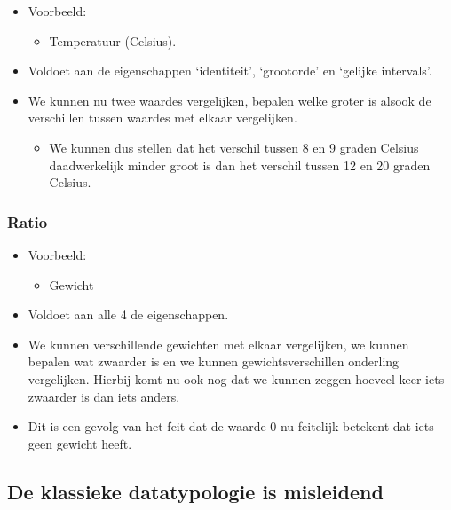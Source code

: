 \documentclass[]{tufte-book}
\providecommand{\tightlist}{%
  \setlength{\itemsep}{0pt}\setlength{\parskip}{0pt}}
\begin{document}
\begin{itemize}
\tightlist
\item
  Voorbeeld:

  \begin{itemize}
  \tightlist
  \item
    Temperatuur (Celsius).
  \end{itemize}
\item
  Voldoet aan de eigenschappen `identiteit', `grootorde' en `gelijke intervals'.
\item
  We kunnen nu twee waardes vergelijken, bepalen welke groter is alsook de verschillen tussen waardes met elkaar vergelijken.

  \begin{itemize}
  \tightlist
  \item
    We kunnen dus stellen dat het verschil tussen 8 en 9 graden Celsius daadwerkelijk minder groot is dan het verschil tussen 12 en 20 graden Celsius.
  \end{itemize}
\end{itemize}

\hypertarget{ratio}{%
\subsubsection*{Ratio}\label{ratio}}

\begin{itemize}
\tightlist
\item
  Voorbeeld:

  \begin{itemize}
  \tightlist
  \item
    Gewicht
  \end{itemize}
\item
  Voldoet aan alle 4 de eigenschappen.
\item
  We kunnen verschillende gewichten met elkaar vergelijken, we kunnen bepalen wat zwaarder is en we kunnen gewichtsverschillen onderling vergelijken. Hierbij komt nu ook nog dat we kunnen zeggen hoeveel keer iets zwaarder is dan iets anders.
\item
  Dit is een gevolg van het feit dat de waarde 0 nu feitelijk betekent dat iets geen gewicht heeft.
\end{itemize}

\hypertarget{de-klassieke-datatypologie-is-misleidend}{%
\subsection{De klassieke datatypologie is misleidend}\label{de-klassieke-datatypologie-is-misleidend}}
\end{document}
